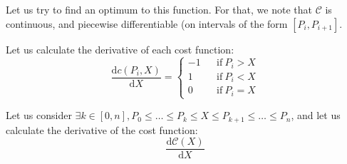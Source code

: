 \documentclass[a4paper,11pt]{article}
\begin{document}
Let us try to find an optimum to this function. For that, we note that
$\mathcal{C}$ is continuous, and piecewise differentiable (on intervals of the
form $[P_i, P_{i + 1}]$.

Let us calculate the derivative of each cost function:
\begin{equation}
\frac{\mathrm{d} c(P_i, X)}{\mathrm{d} X} = \left\{
\begin{array}{lcl}
-1 & & \text{if}~P_i > X \\
1 & & \text{if}~P_i < X \\
0 & & \text{if}~P_i = X
\end{array}
\right.
\end{equation}

Let us consider $\exists k \in [0,n], P_0 \leq \ldots \leq P_k \leq X \leq P_{k+1} \leq \ldots \leq P_n$,
and let us calculate the derivative of the cost function:
\begin{equation}
\frac{\mathrm{d}\mathcal{C}(X)}{\mathrm{d}X}
\end{equation}
\end{document}
